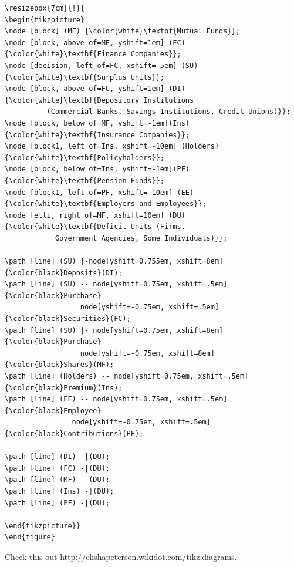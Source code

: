 \documentclass{beamer}\usepackage[]{graphicx}\usepackage[]{color}
\begin{document}
\begin{frame}[fragile]
\tiny\begin{verbatim}
\resizebox{7cm}{!}{
\begin{tikzpicture}
\node [block] (MF) {\color{white}\textbf{Mutual Funds}};
\node [block, above of=MF, yshift=1em] (FC) {\color{white}\textbf{Finance Companies}};
\node [decision, left of=FC, xshift=-5em] (SU) {\color{white}\textbf{Surplus Units}};
\node [block, above of=FC, yshift=1em] (DI) {\color{white}\textbf{Depository Institutions
          (Commercial Banks, Savings Institutions, Credit Unions)}};
\node [block, below of=MF, yshift=-1em](Ins){\color{white}\textbf{Insurance Companies}};
\node [block1, left of=Ins, xshift=-10em] (Holders) {\color{white}\textbf{Policyholders}};
\node [block, below of=Ins, yshift=-1em](PF){\color{white}\textbf{Pension Funds}};
\node [block1, left of=PF, xshift=-10em] (EE) {\color{white}\textbf{Employers and Employees}};
\node [elli, right of=MF, xshift=10em] (DU) {\color{white}\textbf{Deficit Units (Firms.
            Government Agencies, Some Individuals)}};

\path [line] (SU) |-node[yshift=0.755em, xshift=8em] {\color{black}Deposits}(DI);
\path [line] (SU) -- node[yshift=0.75em, xshift=.5em] {\color{black}Purchase} 
                  node[yshift=-0.75em, xshift=.5em] {\color{black}Securities}(FC);
\path [line] (SU) |- node[yshift=0.75em, xshift=8em] {\color{black}Purchase} 
                  node[yshift=-0.75em, xshift=8em] {\color{black}Shares}(MF);
\path [line] (Holders) -- node[yshift=0.75em, xshift=.5em] {\color{black}Premium}(Ins);
\path [line] (EE) -- node[yshift=0.75em, xshift=.5em] {\color{black}Employee} 
                node[yshift=-0.75em, xshift=.5em] {\color{black}Contributions}(PF);

\path [line] (DI) -|(DU);
\path [line] (FC) -|(DU);
\path [line] (MF) --(DU);
\path [line] (Ins) -|(DU);
\path [line] (PF) -|(DU);

\end{tikzpicture}}
\end{figure}
\end{verbatim}\vspace*{-.25in}
Check this out \url{http://elishapeterson.wikidot.com/tikz:diagrams}.
\end{frame}
\end{document}

